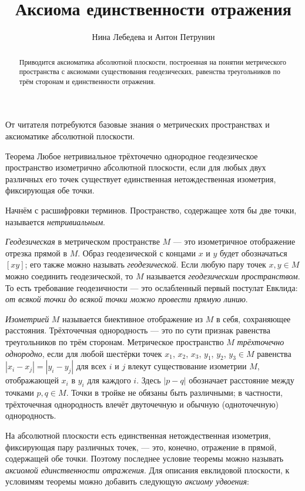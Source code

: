 \documentclass[a4paper,10pt]{article}
\def\thetitle{Аксиома единственности отражения}
\def\theauthors{Нина Лебедева и Антон Петрунин}
\begin{document}
\title{\thetitle}
\author{\theauthors}
\date{}
\maketitle


\begin{abstract}
Приводится аксиоматика абсолютной плоскости, построенная на понятии метрического пространства с аксиомами существования геодезических, равенства треугольников по трём сторонам и единственности отражения.
\end{abstract}

От читателя потребуются базовые знания о метрических пространствах и аксиоматике абсолютной плоскости.

\begin{thm}{Теорема}\label{thm:main}
Любое нетривиальное трёхточечно однородное геодезическое пространство изометрично абсолютной плоскости,
если для любых двух различных его точек существует единственная нетождественная изометрия, фиксирующая обе точки.
\end{thm}

Начнём с расшифровки терминов.
Пространство, содержащее хотя бы две точки, называется \emph{нетривиальным}.

\emph{Геодезическая} в метрическом пространстве $M$ --- это изометричное отображение отрезка прямой в $M$.
Образ геодезической с концами $x$ и $y$ будет обозначаться $[xy]$; его также можно называть \emph{геодезической}.
Если любую пару точек $x,y\in M$ можно соединить геодезической, то $M$ называется \emph{геодезическим пространством}.
То есть требование геодезичности --- это ослабленный первый постулат Евклида: \textit{от всякой точки до всякой точки можно провести прямую линию}.

\emph{Изометрией} $M$ называется биективное отображение из $M$ в себя, сохраняющее расстояния.
Трёхточечная однородность --- это по сути признак равенства треугольников по трём сторонам.
Метрическое пространство $M$ \emph{трёхточечно однородно}, если для любой шестёрки точек $x_1$, $x_2$, $x_3$, $y_1$, $y_2$, $y_3\in M$ равенства $|x_i-x_j|=|y_i-y_j|$ для всех $i$ и $j$ влекут существование изометрии $M$, отображающей $x_i$ в $y_i$ для каждого $i$.
Здесь $|p-q|$ обозначает расстояние между точками $p,q\in M$.
Точки в тройке не обязаны быть различными; в частности, трёхточечная однородность влечёт двуточечную и обычную (одноточечную) однородность.

На абсолютной плоскости есть единственная нетождественная изометрия, фиксирующая пару различных точек, --- это, конечно, отражение в прямой, содержащей обе точки.
Поэтому последнее условие теоремы можно называть \emph{аксиомой единственности отражения}.
Для описания евклидовой плоскости, к условимям теоремы можно добавить следующую \emph{аксиому удвоения}:
\end{document}
